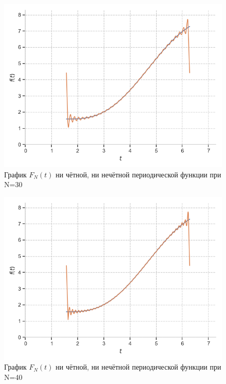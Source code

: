 \documentclass[a4paper, 16pt]{article}
\begin{document}
\newpage
\vspace*{10mm}
\begin{figure}[!htb]
    \centering
    \includegraphics[scale=0.8]{fur_evodd_n=30.png}
    \captionsetup{skip=0pt}
    \caption{График $F_N(t)$ ни чётной, ни нечётной периодической функции при N=30}
    \label{Рис:32}
\end{figure}
\begin{figure}[!htb]
    \centering
    \includegraphics[scale=0.8]{fur_evodd_n=40.png}
    \captionsetup{skip=0pt}
    \caption{График $F_N(t)$ ни чётной, ни нечётной периодической функции при N=40}
    \label{Рис:33}
\end{figure}
\newpage
\end{document}
